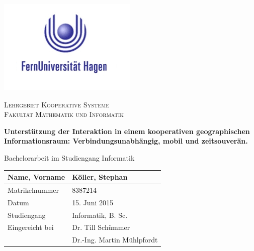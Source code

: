 \thispagestyle{empty}
\vspace{3cm}
  \begin{center}
	

  \includegraphics[scale=0.8]{bilder/fernuni-logo.png}\\ \vspace{0.8cm}

  \scshape Lehrgebiet Kooperative Systeme\\
  \scshape Fakultät Mathematik und Informatik
  \vspace{1cm}

  \bfseries{\Large{Unterstützung der Interaktion in einem kooperativen geographischen Informationsraum: Verbindungsunabhängig, mobil und zeitsouverän.
}}

  \vspace{2cm}

	Bachelorarbeit im Studiengang Informatik %

  \vspace{4cm}
  \renewcommand{\arraystretch}{1.5}
	\begin{table}[ht!]
		\centering
		\begin{tabulary}{\columnwidth}{|L|L|}
		\hline
			Name, Vorname & Köller, Stephan\\ \hline
			Matrikelnummer & 8387214\\ \hline
			Datum & 15. Juni 2015\\ \hline
			Studiengang & Informatik, B. Sc.\\ \hline
			Eingereicht bei & Dr. Till Schümmer\\
			& Dr.-Ing. Martin Mühlpfordt\\ \hline
		\end{tabulary}
	\end{table}

  \end{center}

